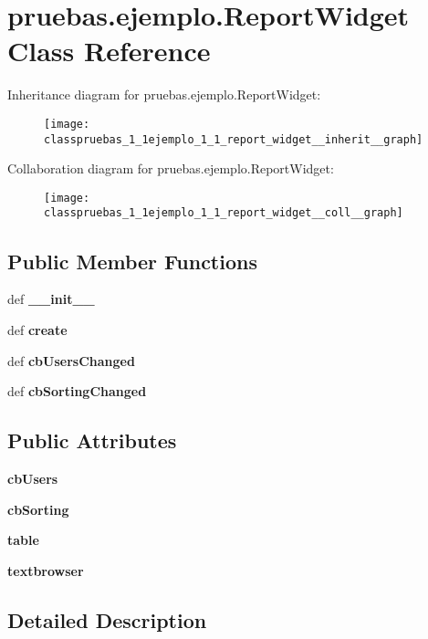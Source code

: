 \section{pruebas.\-ejemplo.\-Report\-Widget \-Class \-Reference}
\label{classpruebas_1_1ejemplo_1_1_report_widget}


\-Inheritance diagram for pruebas.\-ejemplo.\-Report\-Widget\-:\nopagebreak
\begin{figure}[H]
\begin{center}
\leavevmode
\texttt{[image: classpruebas\_1\_1ejemplo\_1\_1\_report\_widget\_\_inherit\_\_graph]}
\end{center}
\end{figure}


\-Collaboration diagram for pruebas.\-ejemplo.\-Report\-Widget\-:\nopagebreak
\begin{figure}[H]
\begin{center}
\leavevmode
\texttt{[image: classpruebas\_1\_1ejemplo\_1\_1\_report\_widget\_\_coll\_\_graph]}
\end{center}
\end{figure}
\subsection*{\-Public \-Member \-Functions}
\begin{DoxyCompactItemize}
\item 
def {\bf \-\_\-\-\_\-init\-\_\-\-\_\-}
\item 
def {\bf create}
\item 
def {\bf cb\-Users\-Changed}
\item 
def {\bf cb\-Sorting\-Changed}
\end{DoxyCompactItemize}
\subsection*{\-Public \-Attributes}
\begin{DoxyCompactItemize}
\item 
{\bf cb\-Users}
\item 
{\bf cb\-Sorting}
\item 
{\bf table}
\item 
{\bf textbrowser}
\end{DoxyCompactItemize}


\subsection{\-Detailed \-Description}



